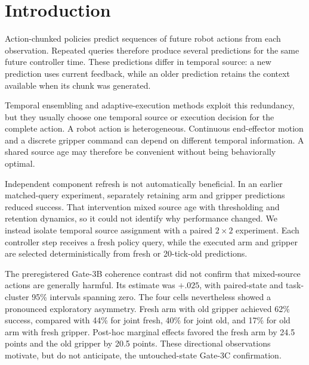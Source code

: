 
%

\section{Introduction}

Action-chunked policies predict sequences of future robot actions from each
observation. Repeated queries therefore produce several predictions for the
same future controller time. These predictions differ in temporal source: a
new prediction uses current feedback, while an older prediction retains the
context available when its chunk was generated.

Temporal ensembling and adaptive-execution methods exploit this redundancy, but
they usually choose one temporal source or execution decision for the complete
action. A robot action is heterogeneous. Continuous end-effector motion and a
discrete gripper command can depend on different temporal information. A shared
source age may therefore be convenient without being behaviorally optimal.

Independent component refresh is not automatically beneficial. In an earlier
matched-query experiment, separately retaining arm and gripper predictions
reduced success. That intervention mixed source age with thresholding and
retention dynamics, so it could not identify why performance changed. We
instead isolate temporal source assignment with a paired $2\times2$ experiment.
Each controller step receives a fresh policy query, while the executed arm and
gripper are selected deterministically from fresh or 20-tick-old predictions.

The preregistered Gate-3B coherence contrast did not confirm that mixed-source
actions are generally harmful. Its estimate was $+.025$, with paired-state and
task-cluster 95\% intervals spanning zero. The four cells nevertheless showed
a pronounced exploratory asymmetry. Fresh arm with old gripper achieved 62\%
success, compared with 44\% for joint fresh, 40\% for joint old, and 17\% for
old arm with fresh gripper. Post-hoc marginal effects favored the fresh arm by
24.5 points and the old gripper by 20.5 points. These directional observations
motivate, but do not anticipate, the untouched-state Gate-3C confirmation.

